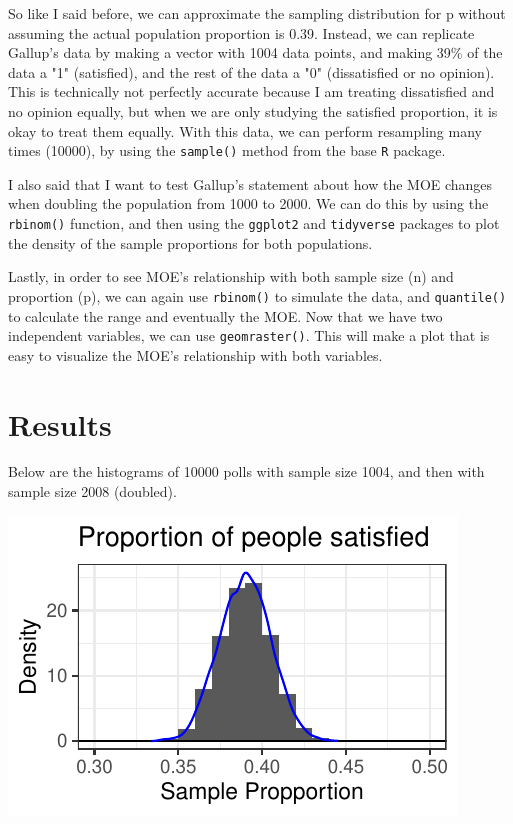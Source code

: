 \documentclass{article}\usepackage[]{graphicx}\usepackage[]{xcolor}
\newenvironment{Figure}
  {\par\medskip\noindent\minipage{\linewidth}}
  {\endminipage\par\medskip}
\begin{document}
\begin{multicols}{2}
So like I said before, we can approximate the sampling distribution for p without assuming the actual population proportion is 0.39. Instead, we can replicate Gallup's data by making a vector with 1004 data points, and making 39\% of the data a "1" (satisfied), and the rest of the data a "0" (dissatisfied or no opinion). This is technically not perfectly accurate because I am treating dissatisfied and no opinion equally, but when we are only studying the satisfied proportion, it is okay to treat them equally. With this data, we can perform resampling many times (10000), by using the \texttt{sample()} method from the base \texttt{R} package.

I also said that I want to test Gallup's statement about how the MOE changes when doubling the population from 1000 to 2000. We can do this by using the \texttt{rbinom()} function, and then using the \texttt{ggplot2} \citep{ggplot2} and \texttt{tidyverse} \citep{tidyverse} packages to plot the density of the sample proportions for both populations.

Lastly, in order to see MOE's relationship with both sample size (n) and proportion (p), we can again use \texttt{rbinom()} to simulate the data, and \texttt{quantile()} to calculate the range and eventually the MOE. Now that we have two independent variables, we can use \texttt{geom\textunderscore raster()}. This will make a plot that is easy to visualize the MOE's relationship with both variables.
\section{Results}
Below are the histograms of 10000 polls with sample size 1004, and then with sample size 2008 (doubled).

\begin{Figure}
\includegraphics{Histogram1.pdf}
\label{fig:histogram1}
\end{Figure}


\end{multicols}
\end{document}
